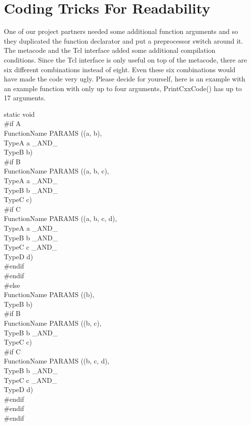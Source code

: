 
%

\chapter{\label{coding-tricks}Coding Tricks For Readability}


One of our project partners needed some additional function arguments and so they duplicated the function declarator and put a preprocessor switch around it.
The metacode and the Tcl interface added some additional compilation conditions.
Since the Tcl interface is only useful on top of the metacode, there are six different combinations instead of eight.
Even these six combinations would have made the code very ugly.
Please decide for yourself, here is an example with an example function with only up to four arguments, {\C PrintCxxCode()} has up to 17 arguments.

\begin{Ccode}
static void\\
\#if A\\
FunctionName PARAMS ((a, b),\\
  \>TypeA a \_AND\_\\
  \>TypeB b)\\
\#if B\\
FunctionName PARAMS ((a, b, c),\\
  \>TypeA a \_AND\_\\
  \>TypeB b \_AND\_\\
  \>TypeC c)\\
\#if C\\
FunctionName PARAMS ((a, b, c, d),\\
  \>TypeA a \_AND\_\\
  \>TypeB b \_AND\_\\
  \>TypeC c \_AND\_\\
  \>TypeD d)\\
\#endif\\
\#endif\\
\#else\\
FunctionName PARAMS ((b),\\
  \>TypeB b)\\
\#if B\\
FunctionName PARAMS ((b, c),\\
  \>TypeB b \_AND\_\\
  \>TypeC c)\\
\#if C\\
FunctionName PARAMS ((b, c, d),\\
  \>TypeB b \_AND\_\\
  \>TypeC c \_AND\_\\
  \>TypeD d)\\
\#endif\\
\#endif\\
\#endif
\end{Ccode}

